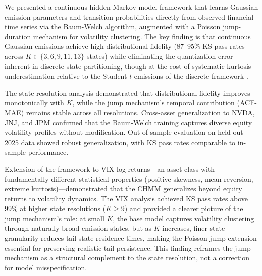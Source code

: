 We presented a continuous hidden Markov model framework that learns Gaussian emission parameters and transition probabilities directly from observed financial time series via the Baum-Welch algorithm, augmented with a Poisson jump-duration mechanism for volatility clustering.
The key finding is that continuous Gaussian emissions achieve high distributional fidelity (87--95\% KS pass rates across $K \in \{3, 6, 9, 11, 13\}$ states) while eliminating the quantization error inherent in discrete state partitioning, though at the cost of systematic kurtosis underestimation relative to the Student-$t$ emissions of the discrete framework \citep{alswaidan2026hybrid}.

The state resolution analysis demonstrated that distributional fidelity improves monotonically with $K$, while the jump mechanism's temporal contribution (ACF-MAE) remains stable across all resolutions.
Cross-asset generalization to NVDA, JNJ, and JPM confirmed that the Baum-Welch training captures diverse equity volatility profiles without modification.
Out-of-sample evaluation on held-out 2025 data showed robust generalization, with KS pass rates comparable to in-sample performance.

Extension of the framework to VIX log returns---an asset class with fundamentally different statistical properties (positive skewness, mean reversion, extreme kurtosis)---demonstrated that the CHMM generalizes beyond equity returns to volatility dynamics.
The VIX analysis achieved KS pass rates above 99\% at higher state resolutions ($K \geq 9$) and provided a clearer picture of the jump mechanism's role: at small $K$, the base model captures volatility clustering through naturally broad emission states, but as $K$ increases, finer state granularity reduces tail-state residence times, making the Poisson jump extension essential for preserving realistic tail persistence.
This finding reframes the jump mechanism as a structural complement to the state resolution, not a correction for model misspecification.

